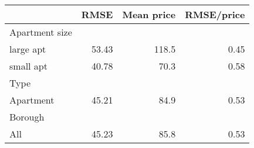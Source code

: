 
\begin{tabular}{lrrr}
\toprule
 & RMSE & Mean price & RMSE/price\\
\midrule
Apartment size &  &  & \\
large apt & 53.43 & 118.5 & 0.45\\
small apt & 40.78 & 70.3 & 0.58\\
Type &  &  & \\
Apartment & 45.21 & 84.9 & 0.53\\
Borough &  &  & \\
All & 45.23 & 85.8 & 0.53\\
\bottomrule
\end{tabular}